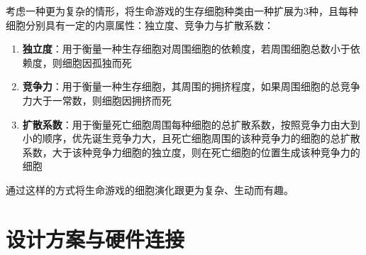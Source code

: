 \documentclass[11pt]{article}
\begin{document}
\hspace{2em}考虑一种更为复杂的情形，将生命游戏的生存细胞种类由一种扩展为3种，且每种细胞分别具有一定的内禀属性：独立度、竞争力与扩散系数：
\begin{enumerate}
    \item \textbf{独立度}：用于衡量一种生存细胞对周围细胞的依赖度，若周围细胞总数小于依赖度，则细胞因孤独而死
    \item \textbf{竞争力}：用于衡量一种生存细胞，其周围的拥挤程度，如果周围细胞的总竞争力大于一常数，则细胞因拥挤而死
    \item \textbf{扩散系数}：用于衡量死亡细胞周围每种细胞的总扩散系数，按照竞争力由大到小的顺序，优先诞生竞争力大，且死亡细胞周围的该种竞争力的细胞的总扩散系数，大于该种竞争力细胞的独立度，则在死亡细胞的位置生成该种竞争力的细胞
\end{enumerate}

\hspace{2em}通过这样的方式将生命游戏的细胞演化跟更为复杂、生动而有趣。

\section{设计方案与硬件连接}
\end{document}
